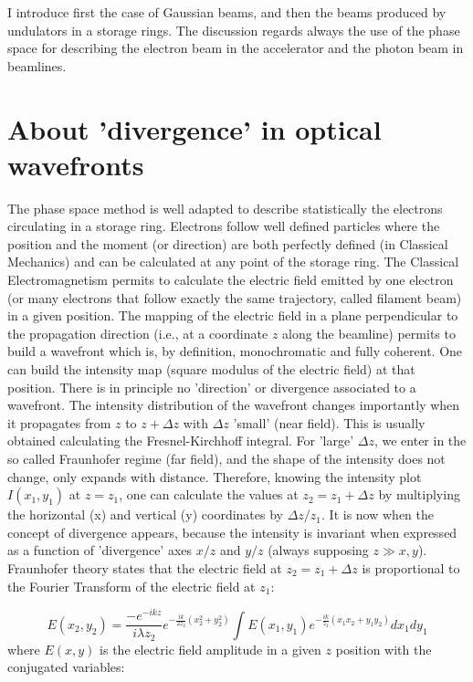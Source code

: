 \documentclass{iucr}              %
\begin{document}
I introduce first the case of Gaussian beams, and then the beams produced by undulators in a storage rings. The discussion regards always the use of the phase space for describing the electron beam in the accelerator and the photon beam in beamlines. 

\section{About 'divergence' in optical wavefronts}

The phase space method is well adapted to describe statistically the electrons circulating in a storage ring. Electrons follow well defined particles where  the position and the moment (or direction) are both perfectly defined (in Classical Mechanics) and can be calculated at any point of the storage ring. The Classical Electromagnetism permits to calculate the electric field emitted by one electron (or many electrons that follow exactly the same trajectory, called filament beam) in a given position. The mapping of the electric field in a plane perpendicular to the propagation direction (i.e., at a coordinate $z$ along the beamline) permits to build a wavefront which is, by definition, monochromatic and fully coherent. One can build the intensity map (square modulus of the electric field) at that position. There is in principle no 'direction' or divergence associated to a wavefront. The intensity distribution of the wavefront changes importantly  when it propagates from $z$ to $z+\Delta z$ with $\Delta z$ 'small' (near field). This is usually obtained calculating the Fresnel-Kirchhoff integral. For 'large' $\Delta z$, we enter in the so called Fraunhofer regime (far field), and the shape of the intensity does not change, only expands with distance. Therefore, knowing the intensity plot $I(x_1,y_1)$ at $z=z_1$, one can calculate the values at $z_2=z_1+\Delta z$ by multiplying the horizontal (x) and vertical (y) coordinates by $\Delta z/z_1$. It is now when the concept of divergence appears, because the intensity is invariant when expressed as a function of 'divergence' axes $x/z$ and $y/z$ (always supposing $z \gg x,y$). Fraunhofer theory states that the electric field at $z_2=z_1+\Delta z$ is proportional to the Fourier Transform of the electric field at $z_1$:

\begin{equation}
E(x_2,y_2) = \frac{-e^{-ikz}}{i \lambda z_2} e^{-\frac{i k}{2z_2}(x_2^2 + y_2^2)} \int{E(x_1,y_1)} e^{-\frac{i k}{z_2}(x_1 x_2 + y_1 y_2)} dx_1 dy_1 
\end{equation}
where $E(x,y)$ is the electric field amplitude in a given $z$ position with the conjugated variables: 
\end{document}
